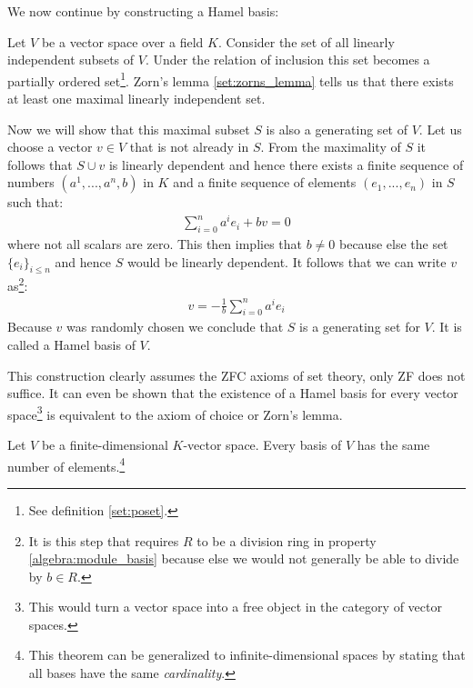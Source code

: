 	We now continue by constructing a Hamel basis:
	\begin{construct}\label{linalgebra:hamel_basis}
		Let $V$ be a vector space over a field $K$. Consider the set of all linearly independent subsets of $V$. Under the relation of inclusion this set becomes a partially ordered set\footnote{See definition \ref{set:poset}.}. Zorn's lemma \ref{set:zorns_lemma} tells us that there exists at least one maximal linearly independent set.

		Now we will show that this maximal subset $S$ is also a generating set of $V$. Let us choose a vector $v\in V$ that is not already in $S$. From the maximality of $S$ it follows that $S\cup v$ is linearly dependent and hence there exists a finite sequence of numbers $(a^1, ..., a^n, b)$ in $K$ and a finite sequence of elements $(e_1, ..., e_n)$ in $S$ such that:
		\begin{gather}
			\sum_{i=0}^n a^ie_i + bv = 0
		\end{gather}
		where not all scalars are zero. This then implies that $b\neq0$ because else the set $\{e_i\}_{i\leq n}$ and hence $S$ would be linearly dependent. It follows that we can write $v$ as\footnote{It is this step that requires $R$ to be a division ring in property \ref{algebra:module_basis} because else we would not generally be able to divide by $b\in R$.}:
		\begin{gather}
			v = -\frac{1}{b}\sum_{i=0}^na^ie_i
		\end{gather}
		Because $v$ was randomly chosen we conclude that $S$ is a generating set for $V$. It is called a Hamel basis of $V$.
	\end{construct}
	\begin{remark}
		This construction clearly assumes the ZFC axioms of set theory, only ZF does not suffice. It can even be shown that the existence of a Hamel basis for every vector space\footnote{This would turn a vector space into a free object in the category of vector spaces.} is equivalent to the axiom of choice or Zorn's lemma.
	\end{remark}

        \begin{property}
		Let $V$ be a finite-dimensional $K$-vector space. Every basis of $V$ has the same number of elements.\footnote{This theorem can be generalized to infinite-dimensional spaces by stating that all bases have the same \textit{cardinality}.}
	\end{property}

